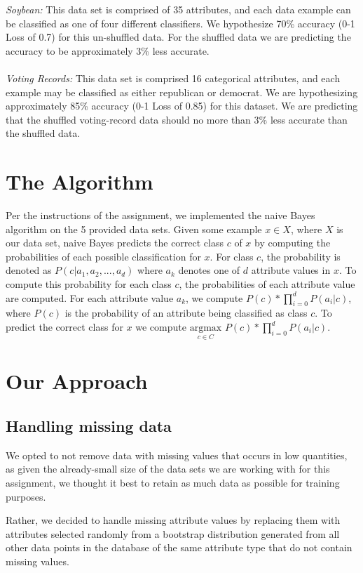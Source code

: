 \documentclass[twoside,11pt]{article}
\begin{document}
\textit{Soybean:} This data set is comprised of 35 attributes, and each data example can be classified as one of four different classifiers. We hypothesize 70\% accuracy (0-1 Loss of 0.7) for this un-shuffled data. For the shuffled data we are predicting the accuracy to be approximately 3\% less accurate.\\ \\
\textit{Voting Records:} This data set is comprised 16 categorical attributes, and each example may be classified as either republican or democrat. We are hypothesizing approximately 85\% accuracy (0-1 Loss of 0.85) for this dataset. We are predicting that the shuffled voting-record data should no more than 3\% less accurate than the shuffled data.\\

\section{The Algorithm}
Per the instructions of the assignment, we implemented the naive Bayes algorithm on the 5 provided data sets. Given some example $x \in X$, where $X$ is our data set, naive Bayes predicts the correct class $c$ of $x$ by computing the probabilities of each possible classification for $x$. For class $c$, the probability is denoted as $P(c | a_1, a_2,...,a_d)$ where $a_k$ denotes one of $d$ attribute values in $x$. To compute this probability for each class $c$, the probabilities of each attribute value are computed. For each attribute value $a_k$, we compute $P(c) * \prod^d_{i=0} P(a_i | c)$, where $P(c)$ is the probability of an attribute being classified as class $c$. To predict the correct class for $x$ we compute $\underset{c \in C}{\mathrm{argmax}}$ $P(c) * \prod^d_{i=0} P(a_i | c)$.

\section{Our Approach}
\subsection{Handling missing data}
 We opted to not remove data with missing values that occurs in low quantities, as given the already-small size of the data sets we are working with for this assignment, we thought it best to retain as much data as possible for training purposes.

Rather, we decided to handle missing attribute values by replacing them with attributes selected randomly from a bootstrap distribution generated from all other data points in the database of the same attribute type that do not contain missing values. 
\end{document}
